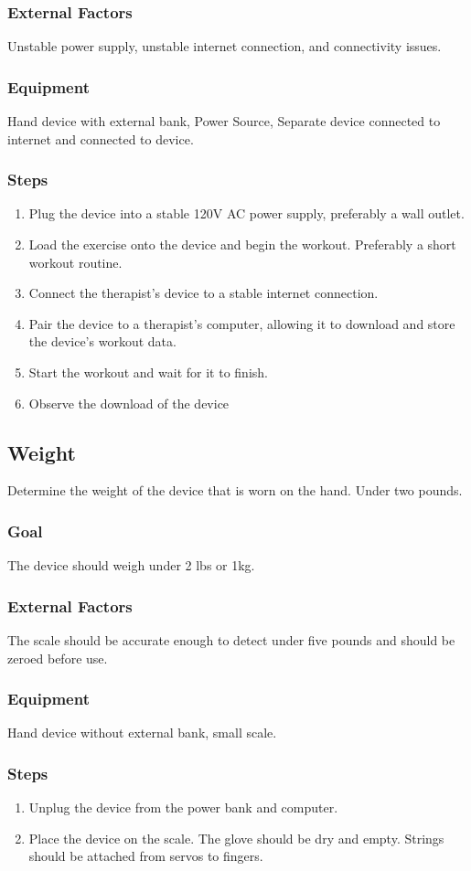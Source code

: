\documentclass{article}
\begin{document}
\subsubsection{External Factors} Unstable power supply, unstable internet connection, and connectivity issues.
\subsubsection{Equipment} Hand device with external bank, Power Source, Separate device connected to
internet and connected to device.
\subsubsection{Steps}
\begin{enumerate}
\item Plug the device into a stable 120V AC power supply, preferably a wall outlet.
\item Load the exercise onto the device and begin the workout. Preferably a short workout
routine.
\item Connect the therapist's device to a stable internet connection.
\item Pair the device to a therapist's computer, allowing it to download and store the device's
workout data.
\item Start the workout and wait for it to finish.
\item Observe the download of the device
\end{enumerate}
\subsection{Weight}
Determine the weight of the device that is worn on the hand. Under two pounds.
\subsubsection{Goal} The device should weigh under 2 lbs or 1kg.
\subsubsection{External Factors} The scale should be accurate enough to detect under five pounds and should
be zeroed before use.
\subsubsection{Equipment} Hand device without external bank, small scale.
\subsubsection{Steps}
\begin{enumerate}
\item Unplug the device from the power bank and computer.
\item Place the device on the scale. The glove should be dry and empty. Strings should be attached from servos to fingers.
\end{enumerate}
\end{document}
